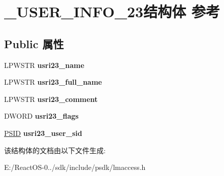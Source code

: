 \hypertarget{struct___u_s_e_r___i_n_f_o__23}{}\section{\+\_\+\+U\+S\+E\+R\+\_\+\+I\+N\+F\+O\+\_\+23结构体 参考}
\label{struct___u_s_e_r___i_n_f_o__23}
\subsection*{Public 属性}
\begin{DoxyCompactItemize}
\item 
\mbox{\label{struct___u_s_e_r___i_n_f_o__23_a8ff1dec70ccf0815d59f2e0c9f4d5119}} 
L\+P\+W\+S\+TR {\bfseries usri23\+\_\+name}
\item 
\mbox{\label{struct___u_s_e_r___i_n_f_o__23_ae92000038296cec4a838a8daf14ba3ee}} 
L\+P\+W\+S\+TR {\bfseries usri23\+\_\+full\+\_\+name}
\item 
\mbox{\label{struct___u_s_e_r___i_n_f_o__23_aa06701c3cc6e7bf871be2e35ee4780be}} 
L\+P\+W\+S\+TR {\bfseries usri23\+\_\+comment}
\item 
\mbox{\label{struct___u_s_e_r___i_n_f_o__23_a04ad8b42bd161400fcfd0c4dd18be7b1}} 
D\+W\+O\+RD {\bfseries usri23\+\_\+flags}
\item 
\mbox{\label{struct___u_s_e_r___i_n_f_o__23_a1ff47ba915e035eb4ad46e17a13ae76c}} 
\hyperlink{struct___s_i_d}{P\+S\+ID} {\bfseries usri23\+\_\+user\+\_\+sid}
\end{DoxyCompactItemize}


该结构体的文档由以下文件生成\+:\begin{DoxyCompactItemize}
\item 
E\+:/\+React\+O\+S-\/0../sdk/include/psdk/lmaccess.\+h\end{DoxyCompactItemize}
